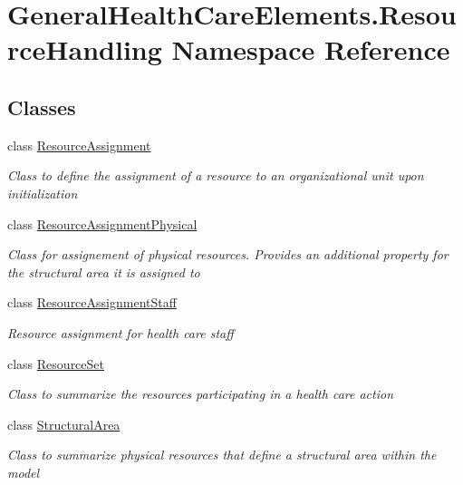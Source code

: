 \hypertarget{namespace_general_health_care_elements_1_1_resource_handling}{}\section{General\+Health\+Care\+Elements.\+Resource\+Handling Namespace Reference}
\label{namespace_general_health_care_elements_1_1_resource_handling}
\subsection*{Classes}
\begin{DoxyCompactItemize}
\item 
class \hyperlink{class_general_health_care_elements_1_1_resource_handling_1_1_resource_assignment}{Resource\+Assignment}
\begin{DoxyCompactList}\small\item\em Class to define the assignment of a resource to an organizational unit upon initialization \end{DoxyCompactList}\item 
class \hyperlink{class_general_health_care_elements_1_1_resource_handling_1_1_resource_assignment_physical}{Resource\+Assignment\+Physical}
\begin{DoxyCompactList}\small\item\em Class for assignement of physical resources. Provides an additional property for the structural area it is assigned to \end{DoxyCompactList}\item 
class \hyperlink{class_general_health_care_elements_1_1_resource_handling_1_1_resource_assignment_staff}{Resource\+Assignment\+Staff}
\begin{DoxyCompactList}\small\item\em Resource assignment for health care staff \end{DoxyCompactList}\item 
class \hyperlink{class_general_health_care_elements_1_1_resource_handling_1_1_resource_set}{Resource\+Set}
\begin{DoxyCompactList}\small\item\em Class to summarize the resources participating in a health care action \end{DoxyCompactList}\item 
class \hyperlink{class_general_health_care_elements_1_1_resource_handling_1_1_structural_area}{Structural\+Area}
\begin{DoxyCompactList}\small\item\em Class to summarize physical resources that define a structural area within the model \end{DoxyCompactList}\end{DoxyCompactItemize}
